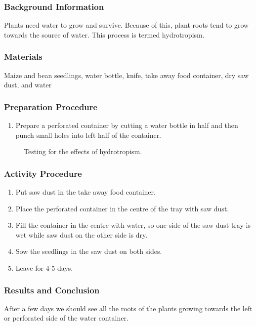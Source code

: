 \subsubsection*{Background Information}
Plants need water to grow and survive. Because of this, plant roots tend to grow towards the source of water. This process is termed hydrotropism.

\subsubsection*{Materials}
Maize and bean seedlings, water bottle, knife, take away food container, dry saw dust, and water

\subsubsection*{Preparation Procedure}
\begin{enumerate}
\item{Prepare a perforated container by cutting a water bottle in half and then punch small holes into left half of the container.}
\end{enumerate}

\begin{figure}[h]
\begin{center}
\def\svgwidth{12cm}

\caption{Testing for the effects of hydrotropism.}
\label{fig:hydro}
\end{center}
\end{figure}

\subsubsection*{Activity Procedure}
\begin{enumerate}
\item{Put saw dust in the take away food container.}
\item{Place the perforated container in the centre of the tray with saw dust.}
\item{Fill the container in the centre with water, so one side of the saw dust tray is wet while saw dust on the other side is dry.}
\item{Sow the seedlings in the saw dust on both sides.}
\item{Leave for 4-5 days.}
\end{enumerate}

\subsubsection*{Results and Conclusion}
After a few days we should see all the roots of the plants growing towards the left or perforated side of the water container.

